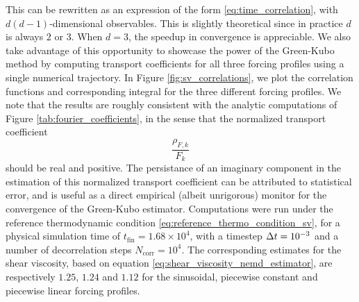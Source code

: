 This can be rewritten as an expression of the form \eqref{eq:time_correlation}, with $d(d-1)$-dimensional observables. 
This is slightly theoretical since in practice $d$ is always $2$ or $3$. When $d=3$, the speedup in convergence is appreciable. 
We also take advantage of this opportunity to showcase the power of the Green-Kubo method by computing transport coefficients for all three forcing profiles using a single numerical trajectory.
In Figure \eqref{fig:sv_correlations}, we plot the correlation functions and corresponding integral for the three different forcing profiles.
We note that the results are roughly consistent with the analytic computations of Figure \ref{tab:fourier_coefficients}, in the sense that the normalized transport coefficient 
\[\frac{\rho_{F,k}}{F_k}\]
should be real and positive. 
The persistance of an imaginary component in the estimation of this normalized transport coefficient can be attributed to statistical error, and is useful as a direct empirical (albeit unrigorous) monitor for the convergence of the Green-Kubo estimator.
Computations were run under the reference thermodynamic condition \eqref{eq:reference_thermo_condition_sv}, for a physical simulation time of $t_{\mathrm{fin}}=1.68\times 10^4$, with a timestep ${\Delta t}=10^{-3}$ and a number of decorrelation steps $N_{\mathrm{corr}}=10^4$.
The corresponding estimates for the shear viscosity, based on equation \eqref{eq:shear_viscosity_nemd_estimator}, are respectively $1.25$, $1.24$ and $1.12$ for the sinusoidal, piecewise constant and piecewise linear forcing profiles.

